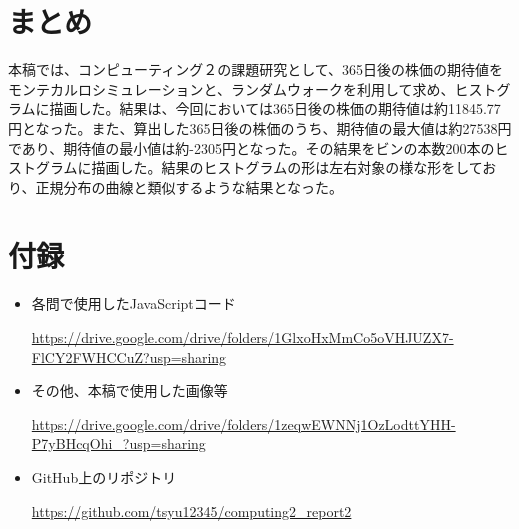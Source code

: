 \documentclass[dvipdfmx]{jsarticle}
\begin{document}
\section{まとめ}
本稿では、コンピューティング２の課題研究として、365日後の株価の期待値をモンテカルロシミュレーションと、ランダムウォークを利用して求め、ヒストグラムに描画した。結果は、今回においては365日後の株価の期待値は約11845.77円となった。また、算出した365日後の株価のうち、期待値の最大値は約27538円であり、期待値の最小値は約-2305円となった。その結果をビンの本数200本のヒストグラムに描画した。結果のヒストグラムの形は左右対象の様な形をしており、正規分布の曲線と類似するような結果となった。
\section{付録}
\begin{itemize}
  \item 各問で使用したJavaScriptコード\par
  \url{https://drive.google.com/drive/folders/1GlxoHxMmCo5oVHJUZX7-FlCY2FWHCCuZ?usp=sharing}
  \item その他、本稿で使用した画像等\par
  \url{https://drive.google.com/drive/folders/1zeqwEWNNj1OzLodttYHH-P7yBHcqOhi_?usp=sharing}
  \item GitHub上のリポジトリ\par
  \url{https://github.com/tsyu12345/computing2_report2}
\end{itemize}
\end{document}
